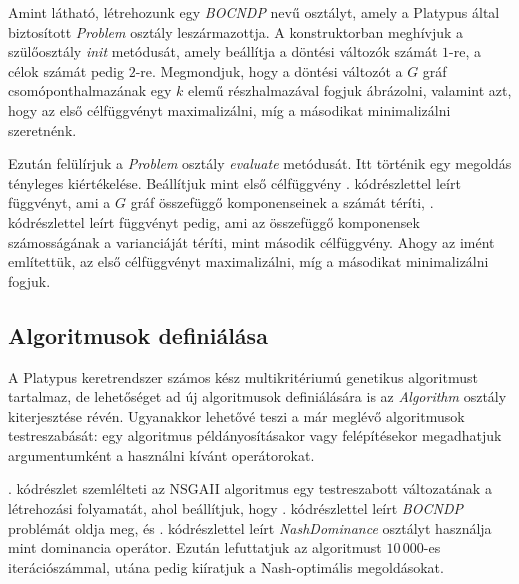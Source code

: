 

Amint látható, létrehozunk egy \emph{BOCNDP} nevű osztályt, amely a Platypus által biztosított \emph{Problem} osztály leszármazottja.
A konstruktorban meghívjuk a szülőosztály \emph{init} metódusát, amely beállítja a döntési változók számát $1$-re, a célok számát pedig $2$-re.
Megmondjuk, hogy a döntési változót a $G$ gráf csomóponthalmazának egy $k$ elemű részhalmazával fogjuk ábrázolni, valamint azt, hogy az első célfüggvényt maximalizálni, míg a másodikat minimalizálni szeretnénk.

Ezután felülírjuk a \emph{Problem} osztály \emph{evaluate} metódusát. Itt történik egy megoldás tényleges kiértékelése.
Beállítjuk mint első célfüggvény . kódrészlettel leírt függvényt, ami a $G$ gráf összefüggő komponenseinek a számát téríti,
. kódrészlettel leírt függvényt pedig, ami az összefüggő komponensek számosságának a varianciáját téríti, mint második célfüggvény.
Ahogy az imént említettük, az első célfüggvényt maximalizálni, míg a másodikat minimalizálni fogjuk.


\subsection{Algoritmusok definiálása}
A Platypus keretrendszer számos kész multikritériumú genetikus algoritmust tartalmaz, de lehetőséget ad új algoritmusok definiálására is az \emph{Algorithm} osztály kiterjesztése révén.
Ugyanakkor lehetővé teszi a már meglévő algoritmusok testreszabását: egy algoritmus példányosításakor vagy felépítésekor megadhatjuk argumentumként a használni kívánt operátorokat.



. kódrészlet szemlélteti az NSGAII algoritmus egy testreszabott változatának a létrehozási folyamatát,
ahol beállítjuk, hogy . kódrészlettel leírt \emph{BOCNDP} problémát oldja meg, és . kódrészlettel leírt \emph{NashDominance} osztályt használja mint dominancia operátor.
Ezután lefuttatjuk az algoritmust $10\,000$-es iterációszámmal, utána pedig kiíratjuk a Nash-optimális megoldásokat.
